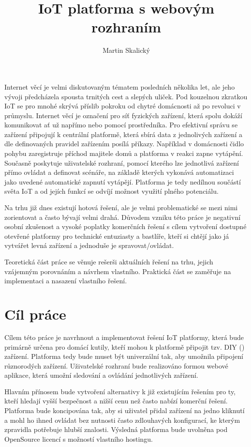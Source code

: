\documentclass[thesis=B,czech]{FITthesis}[2019/12/23]
\title{IoT platforma s webovým rozhraním}
\author{Martin Skalický} %
\begin{document}
\begin{introduction}
    Internet věcí je velmi diskutovaným tématem posledních několika let, ale jeho vývoji předcházela spousta trnitých cest a slepých uliček. Pod kouzelnou zkratkou IoT se pro mnohé skrývá příslib pokroku od chytré domácnosti až po revoluci v průmyslu. Internet věcí je označení pro síť fyzických zařízení, která spolu dokáží komunikovat ať už napřímo nebo pomocí prostředníka. Pro efektivní správu se zařízení připojují k centrální platformě, která sbírá data z jednolivých zařízení a dle definovaných pravidel zařízením posílá příkazy. Například v domácnosti čidlo pohybu zaregistruje příchod majitele domů a platforma v reakci zapne vytápění. Současně poskytuje uživatelské rozhraní, pomocí kterého lze jednotlivá zařízení přímo ovládat a definovat scénáře, na základě kterých vykonává automatizaci jako uvedené automatické zapnutí vytápějí. Platforma je tedy nedílnou součástí světa IoT a od jejích funkcí se odvíjí možnost využití plného potenciálu.

    Na trhu již dnes existují hotová řešení, ale je velmi problematické se mezi nimi zorientovat a často bývají velmi drahá. Důvodem vzniku této práce je negativní osobní zkušenost a vysoké poplatky komerčních řešení s cílem vytvoření dostupné otevřené platformy pro technické entuziasty a bastlíře, kteří si chtějí jako já vytvářet levná zařízení a jednoduše je spravovat/ovládat.

    Teoretická část práce se věnuje rešerši aktuálních řešení na trhu, jejich vzájemným porovnáním a návrhem vlastního. Praktická část se zaměřuje na implementaci a nasazení vlastního řešení.
\end{introduction}

\chapter{Cíl práce}
Cílem této práce je navrhnout a implementovat řešení IoT platformy, která bude primárně určena pro domácí kutily, kteří mohou k platformě připojit tzv. DIY () zařízení. Platforma tedy bude muset být univerzální tak, aby umožnila připojení různorodých zařízení. Uživatelské rozhraní bude realizováno formou webové aplikace, která umožní sledování a ovládání jednotlivých zařízení.

Hlavním přínosem bude vytvoření alternativy k již existujícím řešením pro ty, kteří hledají vyšší bezpečnost a nižší cenu než často nabízí komerční řešení. Platforma bude koncipována tak, aby si uživatel přidal zařízení na jedno kliknutí a mohl ho ihned ovládat bez nutnosti často zdlouhavých konfigurací, ke kterým zpravidla potřebuje hlubší znalosti. Výsledná platforma bude uvolněna pod OpenSource licencí s možností vlastního hostingu.
\end{document}
